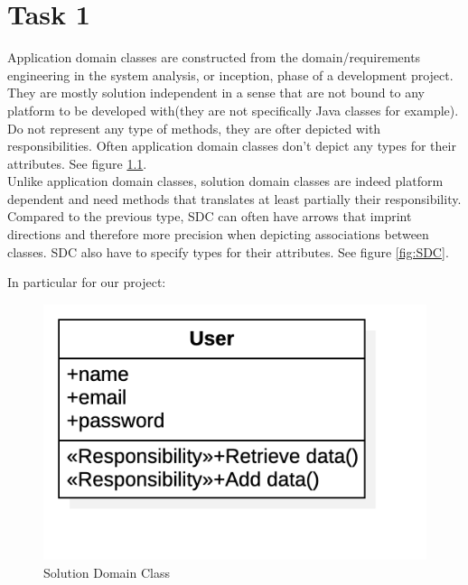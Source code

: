 \chapter{Task 1}
\begin{parlist}
	\item Application domain classes are constructed from the  domain/requirements engineering in the system analysis, or inception, phase of a development project. They are mostly solution independent in a sense that are not bound to any platform to be developed with(they are not specifically Java classes for example). Do not represent any type of methods, they are ofter depicted with responsibilities. Often application domain classes don't depict any types for their attributes. See figure \ref{fig:ADC}. \\
		Unlike application domain classes, solution domain classes are indeed platform dependent and need methods that translates at least partially their responsibility. Compared to the previous type, SDC can often have arrows that imprint directions and therefore more precision when depicting associations between classes. SDC also have to specify types for their attributes. See figure \ref{fig:SDC}.
	\item In particular for our project:
\begin{figure}
\begin{minipage}[c]{0.6\linewidth}
\includegraphics[width=\linewidth]{Immagini/ADC.png}
\caption{Solution Domain Class}
\label{fig:ADC}
\end{minipage}
\hfill
\begin{minipage}[c]{0.6\linewidth}

\end{minipage}
\end{figure}
\end{parlist}
